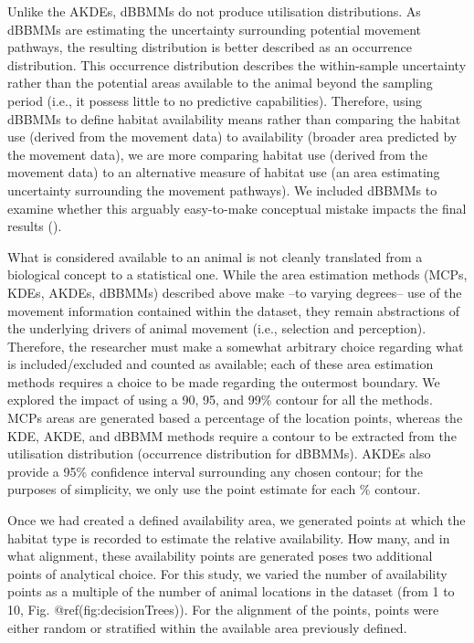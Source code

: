\documentclass[10pt,a4paper]{article}
\begin{document}
Unlike the AKDEs, dBBMMs do not produce utilisation distributions.
As dBBMMs are estimating the uncertainty surrounding potential movement pathways, the resulting distribution is better described as an occurrence distribution.
This occurrence distribution describes the within-sample uncertainty rather than the potential areas available to the animal beyond the sampling period (i.e., it possess little to no predictive capabilities).
Therefore, using dBBMMs to define habitat availability means rather than comparing the habitat use (derived from the movement data) to availability (broader area predicted by the movement data), we are more comparing habitat use (derived from the movement data) to an alternative measure of habitat use (an area estimating uncertainty surrounding the movement pathways).
We included dBBMMs to examine whether this arguably easy-to-make conceptual mistake impacts the final results ().

What is considered available to an animal is not cleanly translated from a biological concept to a statistical one.
While the area estimation methods (MCPs, KDEs, AKDEs, dBBMMs) described above make --to varying degrees-- use of the movement information contained within the dataset, they remain abstractions of the underlying drivers of animal movement (i.e., selection and perception).
Therefore, the researcher must make a somewhat arbitrary choice regarding what is included/excluded and counted as available; each of these area estimation methods requires a choice to be made regarding the outermost boundary.
We explored the impact of using a 90, 95, and 99\% contour for all the methods.
MCPs areas are generated based a percentage of the location points, whereas the KDE, AKDE, and dBBMM methods require a contour to be extracted from the utilisation distribution (occurrence distribution for dBBMMs).
AKDEs also provide a 95\% confidence interval surrounding any chosen contour; for the purposes of simplicity, we only use the point estimate for each \% contour.

Once we had created a defined availability area, we generated points at which the habitat type is recorded to estimate the relative availability.
How many, and in what alignment, these availability points are generated poses two additional points of analytical choice.
For this study, we varied the number of availability points as a multiple of the number of animal locations in the dataset (from 1 to 10, Fig. @ref(fig:decisionTrees)).
For the alignment of the points, points were either random or stratified within the available area previously defined.
\end{document}
